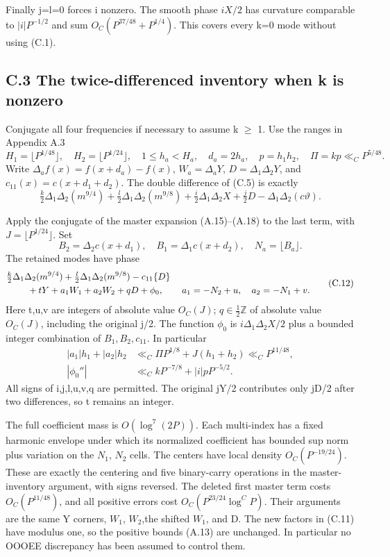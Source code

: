 \documentclass[11pt,a4paper]{article}
\begin{document}
Finally j=l=0 forces i nonzero. The smooth phase \(iX/2\) has curvature
comparable to \(|i|P^{-1/2}\) and sum \(O_C(P^{37/48}+P^{1/4})\). This
covers every k=0 mode without using (C.1).

\subsection{C.3 The twice-differenced inventory when k is
nonzero}\label{c.3-the-twice-differenced-inventory-when-k-is-nonzero}

Conjugate all four frequencies if necessary to assume k \(\ge\) 1. Use
the ranges in Appendix A.3 \[
H_1=\lfloor P^{1/48}\rfloor,\quad H_2=\lfloor P^{1/24}\rfloor,
\quad 1\le h_a<H_a,\quad d_a=2h_a,\quad
p=h_1h_2,\quad \Pi=kp\ll_C P^{5/48}. \tag{C.10}
\] Write \(\Delta_a f(x)=f(x+d_a)-f(x)\), \(W_a=\Delta_aY\),
\(D=\Delta_1\Delta_2Y\), and \(c_{11}(x)=c(x+d_1+d_2)\). The double
difference of (C.5) is exactly \[
\tfrac k2\Delta_1\Delta_2(m^{9/4})
+\tfrac l2\Delta_1\Delta_2(m^{9/8})
+\tfrac i2\Delta_1\Delta_2X+\tfrac j2D
-\Delta_1\Delta_2(c\vartheta). \tag{C.11}
\]

Apply the conjugate of the master expansion (A.15)--(A.18) to the last
term, with \(J=\lfloor P^{1/24}\rfloor\). Set \[
B_2=\Delta_2c(x+d_1),\quad B_1=\Delta_1c(x+d_2),
\quad N_a=\lfloor B_a\rfloor .
\] The retained modes have phase \[
\begin{split}
&\tfrac k2\Delta_1\Delta_2(m^{9/4})
+\tfrac l2\Delta_1\Delta_2(m^{9/8})-c_{11}\{D\}\\
&\hspace{8mm}+tY+a_1W_1+a_2W_2+qD+\phi_0,\qquad
a_1=-N_2+u,\quad a_2=-N_1+v.
\end{split}\tag{C.12}
\] Here t,u,v are integers of absolute value \(O_C(J)\);
\(q\in\frac12\mathbb Z\) of absolute value \(O_C(J)\), including the
original j/2. The function \(\phi_0\) is \(i\Delta_1\Delta_2X/2\) plus a
bounded integer combination of \(B_1,B_2,c_{11}\). In particular \[
\begin{split}
|a_1|h_1+|a_2|h_2
&\ll_C \Pi P^{1/8}+J(h_1+h_2)\ll_C P^{11/48},\\
|\phi_0''|&\ll_C kP^{-7/8}+|i|pP^{-5/2}.
\end{split}\tag{C.13}
\] All signs of i,j,l,u,v,q are permitted. The original jY/2 contributes
only jD/2 after two differences, so t remains an integer.

The full coefficient mass is \(O(\log^7(2P))\). Each multi-index has a
fixed harmonic envelope under which its normalized coefficient has
bounded sup norm plus variation on the \(N_1\), \(N_2\) cells. The
centers have local density \(O_C(P^{-19/24})\). These are exactly the
centering and five binary-carry operations in the master-inventory
argument, with signs reversed. The deleted first master term costs
\(O_C(P^{11/48})\), and all positive errors cost
\(O_C(P^{23/24}\log^C P)\). Their arguments are the same Y corners,
\(W_1\), \(W_2\),the shifted \(W_1\), and D. The new factors in (C.11)
have modulus one, so the positive bounds (A.13) are unchanged. In
particular no OOOEE discrepancy has been assumed to control them.
\end{document}
